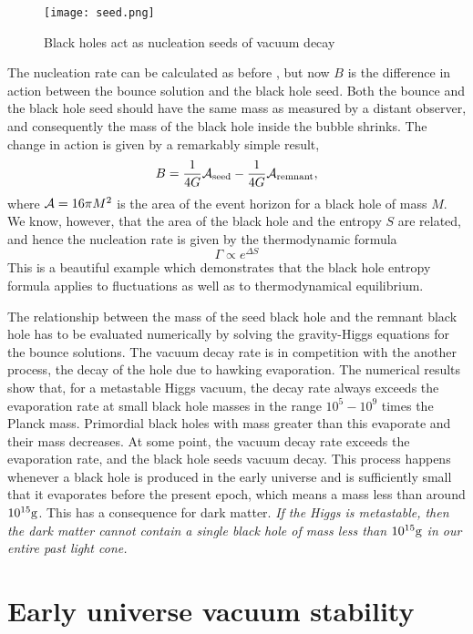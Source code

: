 \documentclass{PoS}
\begin{document}
\begin{figure}
\centering
\texttt{[image: seed.png]}
\caption{Black holes act as nucleation seeds of vacuum decay  
} \label{fig:seed}
\end{figure}

The nucleation rate can be calculated as before \cite{BGM1,BGM3,Gregory:2016xix}, 
but now $B$ is the difference in
action between the bounce solution and the black hole seed. Both the bounce and the
black hole seed should have the same mass as measured by a distant observer, and
consequently the mass of the black hole inside the bubble shrinks. The change
in action is given by a remarkably simple result,
\begin{equation}
B={1\over 4G} {\cal A}_{\rm seed}-{1\over 4G} {\cal A}_{\rm remnant},
\end{equation}
where ${\cal A}=16\pi M^2$ is the area of the event horizon for a black hole of mass $M$.
We know, however, that the area of the black hole and the entropy $S$ are related,
and hence the nucleation rate is given by the thermodynamic formula
\begin{equation}
\Gamma\propto e^{\Delta S}
\end{equation}
This is a beautiful example which demonstrates that the black hole entropy
formula applies to fluctuations as well as to thermodynamical equilibrium.

The relationship between the mass of the seed black hole and the remnant black hole
has to be evaluated numerically by solving the gravity-Higgs equations for the bounce
solutions. The vacuum decay rate is in competition with the another process, the
decay of the hole due to hawking evaporation. The numerical results show that, for a
metastable Higgs vacuum, the decay rate always exceeds the evaporation rate at small
black hole masses in the range $10^5-10^9$ times the Planck mass. 
Primordial black holes with mass greater than this evaporate and their mass
decreases. At some point, the vacuum decay rate exceeds the
evaporation rate, and the black hole seeds vacuum decay. This process happens whenever
a black hole is produced in the early universe and is sufficiently small that it evaporates before
the present epoch, which means a mass less than around $10^{15}{\rm g}$.
This has a consequence for dark matter. {\em If the Higgs is metastable, then the dark
matter cannot contain a single black hole of mass less than $10^{15}{\rm g}$
in our entire past light cone.}

\section{Early universe vacuum stability}
\end{document}
